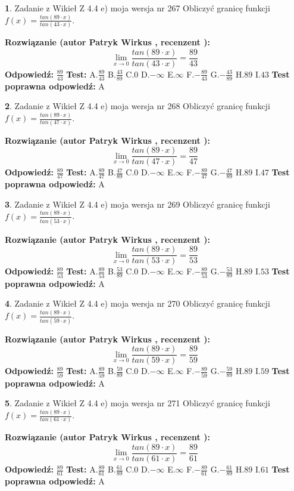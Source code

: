 \documentclass[12pt, a4paper]{article}
\theoremstyle{definition} %
\newtheorem{zad}{}
\newcommand{\zadStart}[1]{\begin{zad}#1\newline}
\newcommand{\zadStop}{\end{zad}}
\newcommand{\rozwStart}[2]{\noindent \textbf{Rozwiązanie (autor #1 , recenzent #2): }\newline}
\newcommand{\rozwStop}{\newline}
\newcommand{\odpStart}{\noindent \textbf{Odpowiedź:}\newline}
\newcommand{\odpStop}{\newline}
\newcommand{\testStart}{\noindent \textbf{Test:}\newline}
\newcommand{\testStop}{\newline}
\newcommand{\kluczStart}{\noindent \textbf{Test poprawna odpowiedź:}\newline}
\newcommand{\kluczStop}{\newline}
\begin{document}
\zadStart{Zadanie z Wikieł Z 4.4 e) moja wersja nr 267}
Obliczyć granicę funkcji $f(x)=\frac{tan(89\cdot x)}{tan(43\cdot x)}$.
\zadStop
\rozwStart{Patryk Wirkus}{}
$$\lim\limits_{x\to 0}\frac{tan(89\cdot x)}{tan(43\cdot x)}=
\frac{89}{43}$$
\rozwStop
\odpStart
$\frac{89}{43}$
\odpStop
\testStart
A.$\frac{89}{43}$
B.$\frac{43}{89}$
C.$0$
D.$-\infty$
E.$\infty$
F.$-\frac{89}{43}$
G.$-\frac{43}{89}$
H.$89$
I.$43$
\testStop
\kluczStart
A
\kluczStop



\zadStart{Zadanie z Wikieł Z 4.4 e) moja wersja nr 268}
Obliczyć granicę funkcji $f(x)=\frac{tan(89\cdot x)}{tan(47\cdot x)}$.
\zadStop
\rozwStart{Patryk Wirkus}{}
$$\lim\limits_{x\to 0}\frac{tan(89\cdot x)}{tan(47\cdot x)}=
\frac{89}{47}$$
\rozwStop
\odpStart
$\frac{89}{47}$
\odpStop
\testStart
A.$\frac{89}{47}$
B.$\frac{47}{89}$
C.$0$
D.$-\infty$
E.$\infty$
F.$-\frac{89}{47}$
G.$-\frac{47}{89}$
H.$89$
I.$47$
\testStop
\kluczStart
A
\kluczStop



\zadStart{Zadanie z Wikieł Z 4.4 e) moja wersja nr 269}
Obliczyć granicę funkcji $f(x)=\frac{tan(89\cdot x)}{tan(53\cdot x)}$.
\zadStop
\rozwStart{Patryk Wirkus}{}
$$\lim\limits_{x\to 0}\frac{tan(89\cdot x)}{tan(53\cdot x)}=
\frac{89}{53}$$
\rozwStop
\odpStart
$\frac{89}{53}$
\odpStop
\testStart
A.$\frac{89}{53}$
B.$\frac{53}{89}$
C.$0$
D.$-\infty$
E.$\infty$
F.$-\frac{89}{53}$
G.$-\frac{53}{89}$
H.$89$
I.$53$
\testStop
\kluczStart
A
\kluczStop



\zadStart{Zadanie z Wikieł Z 4.4 e) moja wersja nr 270}
Obliczyć granicę funkcji $f(x)=\frac{tan(89\cdot x)}{tan(59\cdot x)}$.
\zadStop
\rozwStart{Patryk Wirkus}{}
$$\lim\limits_{x\to 0}\frac{tan(89\cdot x)}{tan(59\cdot x)}=
\frac{89}{59}$$
\rozwStop
\odpStart
$\frac{89}{59}$
\odpStop
\testStart
A.$\frac{89}{59}$
B.$\frac{59}{89}$
C.$0$
D.$-\infty$
E.$\infty$
F.$-\frac{89}{59}$
G.$-\frac{59}{89}$
H.$89$
I.$59$
\testStop
\kluczStart
A
\kluczStop



\zadStart{Zadanie z Wikieł Z 4.4 e) moja wersja nr 271}
Obliczyć granicę funkcji $f(x)=\frac{tan(89\cdot x)}{tan(61\cdot x)}$.
\zadStop
\rozwStart{Patryk Wirkus}{}
$$\lim\limits_{x\to 0}\frac{tan(89\cdot x)}{tan(61\cdot x)}=
\frac{89}{61}$$
\rozwStop
\odpStart
$\frac{89}{61}$
\odpStop
\testStart
A.$\frac{89}{61}$
B.$\frac{61}{89}$
C.$0$
D.$-\infty$
E.$\infty$
F.$-\frac{89}{61}$
G.$-\frac{61}{89}$
H.$89$
I.$61$
\testStop
\kluczStart
A
\kluczStop
\end{document}
